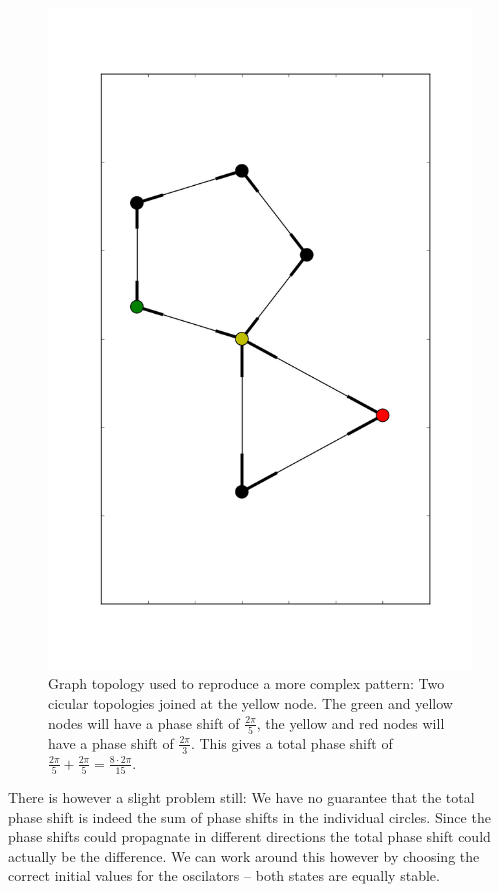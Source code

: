 \begin{figure}[h]
  \centering
  \includegraphics[height=0.5\textheight]{imgs/pattern_joined}
  \caption{Graph topology used to reproduce a more complex pattern: Two cicular topologies joined at the yellow node. The green and yellow nodes will have a phase shift of $\frac{2\pi}{5}$, the yellow and red nodes will have a phase shift of $\frac{2\pi}{3}$. This gives a total phase shift of $\frac{2\pi}{5} + \frac{2\pi}{5} = \frac{8 {\cdot} 2 \pi}{15}$. }
  \label{fig:pattern_joined}
\end{figure}

There is however a slight problem still: We have no guarantee that the total phase shift is indeed the sum of phase shifts in the individual circles. Since the phase shifts could propagnate in different directions the total phase shift could actually be the difference. We can work around this however by choosing the correct initial values for the oscilators -- both states are equally stable. 

